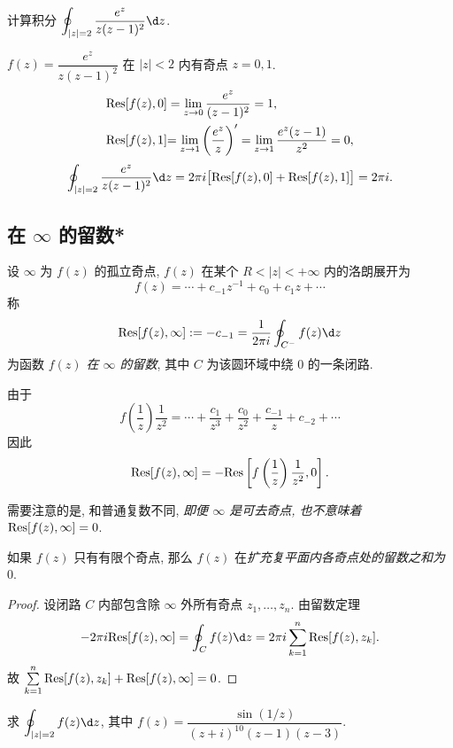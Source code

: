 \begin{example}
	计算积分 $\displaystyle\oint_{|z|=2}\frac{e^z}{z(z-1)^2}\d z$.
\end{example}

\begin{solution}
		$f(z)=\dfrac{e^z}{z(z-1)^2}$ 在 $|z|<2$ 内有奇点 $z=0,1$.
	{\begin{align*}
		{\mathrm{Res}}[f(z),0]&=\lim_{z\to0}\frac{e^z}{(z-1)^2}=1,\\
		{{\mathrm{Res}}[f(z),1]}&{=\lim_{z\to1}\left(\frac{e^z}z\right)'=\lim_{z\to1}\frac{e^z(z-1)}{z^2}=0,}
	\end{align*}\[\oint_{|z|=2}\frac{e^z}{z(z-1)^2}\d z
		=2\pi i\bigl[\Res[f(z),0]+\Res[f(z),1]\bigr]
		=2\pi i.\]
	}
\end{solution}

\subsection{在 \texorpdfstring{$\infty$}{∞} 的留数*}

\begin{definition}
	设 $\infty$ 为 $f(z)$ 的孤立奇点, $f(z)$ 在某个 $R<|z|<+\infty$ 内的洛朗展开为
	\[f(z)=\cdots+c_{-1}z^{-1}+c_0+c_1z+\cdots\]
	称
	\[\Res[f(z),\infty]:=-c_{-1}=\frac1{2\pi i}\oint_{C^-}f(z)\d z\]
	为函数 \emph{$f(z)$ 在 $\infty$ 的留数}, 其中 $C$ 为该圆环域中绕 $0$ 的一条闭路.
\end{definition}

由于
\[f\left(\frac1z\right)\frac1{z^2}=\cdots+\frac{c_1}{z^3}+\frac{c_0}{z^2}+\frac{c_{-1}}z+c_{-2}+\cdots\]
因此 
	\[{\mathrm{Res}}[f(z),\infty]=-{\mathrm{Res}}\left[f\left(\frac1z\right)\frac1{z^2},0\right].\]

需要注意的是, 和普通复数不同, \emph{即便 $\infty$ 是可去奇点, 也不意味着 ${\mathrm{Res}}[f(z),\infty]=0$}.

\begin{theorem}
	如果 $f(z)$ 只有有限个奇点, 那么 $f(z)$ 在\emph{扩充复平面内各奇点处的留数之和为 $0$}.
\end{theorem}

\begin{proof}
	设闭路 $C$ 内部包含除 $\infty$ 外所有奇点 $z_1,\dots,z_n$.
	由留数定理
		\[-2\pi i\Res[f(z),\infty]=\oint_C f(z)\d z=2\pi i\sum_{k=1}^n\Res[f(z),z_k].\]
	故 $\sum\limits_{k=1}^n {\mathrm{Res}}[f(z),z_k]+{\mathrm{Res}}[f(z),\infty]=0$.
\end{proof}

\begin{example}
	求 $\displaystyle\oint_{|z|=2}f(z)\d z$, 其中 $f(z)=\dfrac{\sin(1/z)}{(z+i)^{10}(z-1)(z-3)}$.
\end{example}

